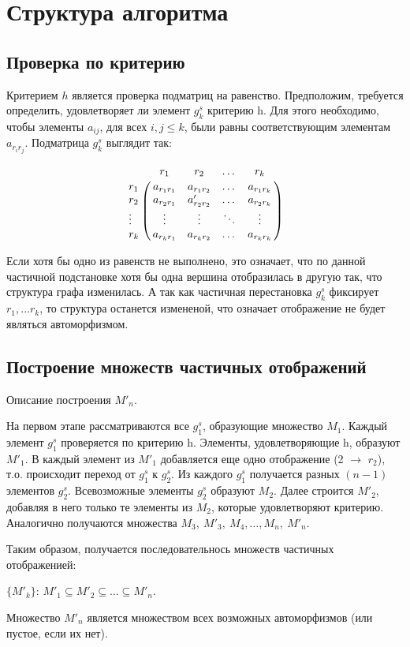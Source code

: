 \section{Структура алгоритма}
\label{sec:AlgoStruct_3} 
\large

\subsection{Проверка по критерию}

Критерием $h$ является проверка подматриц на равенство. Предположим, требуется определить, удовлетворяет ли элемент $g^s_k$ критерию h. Для этого необходимо, чтобы элементы $a_{ij}$, для всех $i,j \leq k$, были равны соответствующим элементам $a_{r_ir_j}$. Подматрица $g^s_k$ выглядит так:

\[ \bordermatrix{
& r_1 & r_2 & \dots & r_k \cr
r_1 & a_{r_1r_1} & a_{r_1r_2} & \dots & a_{r_1r_k} \cr
r_2 & a_{r_2r_1} & a'_{r_2r_2} & \dots & a_{r_2r_k} \cr
\vdots & \vdots & \vdots & \ddots & \vdots \cr
r_k & a_{r_kr_1} & a_{r_kr_2} & \dots & a_{r_kr_k} \cr}
\]

Если хотя бы одно из равенств не выполнено, это означает, что по данной частичной подстановке хотя бы одна вершина отобразилась в другую так, что структура графа изменилась. А так как частичная перестановка $g^s_k$ фиксирует $r_1, \ldots r_k$, то структура останется измененой, что означает отображение не будет являться автоморфизмом.



\subsection{Построение множеств частичных отображений}

Описание построения $M'_n$.

На первом этапе рассматриваются все $g^s_1$, образующие множество $M_1$. Каждый элемент $g^s_1$ проверяется по критерию h. Элементы, удовлетворяющие h, образуют $M'_1$. В каждый элемент из $M'_1$ добавляется еще одно отображение (2 $\to$ $r_2$), т.о. происходит переход от $g^s_1$ к $g^s_2$. Из каждого $g^s_1$ получается разных $(n-1)$ элементов $g^s_2$. Всевозможные элементы $g^s_2$ образуют $M_2$. Далее строится $M'_2$, добавляя в него только те элементы из $M_2$, которые удовлетворяют критерию. Аналогично получаются множества $M_3,\ M'_3,\ M_4,\ldots, M_n,\ M'_n$.


Таким образом, получается последовательнось множеств частичных отображенией:

$\{M'_k\}$: $M'_1 \subseteq M'_2 \subseteq \ldots \subseteq M'_n$.

Множество $M'_n$ является множеством всех возможных автоморфизмов (или пустое, если их нет).
